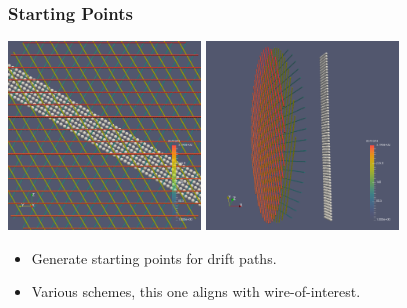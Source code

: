 \documentclass[xcolor=dvipsnames]{beamer}
\begin{document}
\begin{frame}
  \frametitle{Starting Points}
  \begin{center}
    \includegraphics[height=5cm,clip,trim=0cm 0cm 0cm 0cm]{steps/ustarts1.png}%
    \includegraphics[height=5cm,clip,trim=0cm 0cm 00cm 0cm]{steps/ustarts2.png}
  \end{center}
  \begin{itemize}
  \item Generate starting points for drift paths.  
  \item Various schemes, this one aligns with wire-of-interest.
  \end{itemize}
  
\end{frame}
\end{document}
